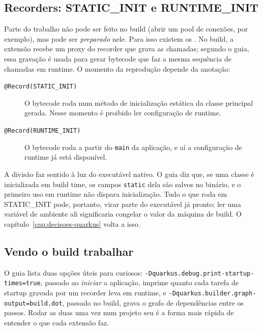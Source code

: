 \subsection*{Recorders: STATIC\_INIT e RUNTIME\_INIT}

Parte do trabalho não pode ser feito no build (abrir um pool de conexões,
por exemplo), mas pode ser \emph{preparado} nele. Para isso existem os
. No build, a extensão recebe um proxy do recorder que grava
as chamadas; segundo o guia, essa gravação é usada para gerar bytecode que
faz a mesma sequência de chamadas em runtime. O momento da reprodução
depende da anotação:

\begin{description}
\item[\texttt{@Record(STATIC\_INIT)}] O bytecode roda num método de
  inicialização estática da classe principal gerada. Nesse momento é
  proibido ler configuração de runtime.
\item[\texttt{@Record(RUNTIME\_INIT)}] O bytecode roda a partir do
  \texttt{main} da aplicação, e aí a configuração de runtime já está
  disponível.
\end{description}

A divisão faz sentido à luz do executável nativo. O guia
 diz que, se uma classe é
inicializada em build time, os campos \texttt{static} dela são salvos no
binário, e o primeiro uso em runtime não dispara inicialização. Tudo o
que roda em STATIC\_INIT pode, portanto, virar parte do executável já
pronto; ler uma variável de ambiente ali significaria congelar o valor
da máquina de build. O capítulo~\ref{cap:decisoes-quarkus} volta a isso.

\subsection*{Vendo o build trabalhar}

O guia lista duas opções úteis para curiosos:
\texttt{-Dquarkus.debug.print-startup-times=true}, passado ao
\emph{iniciar} a aplicação, imprime quanto cada tarefa de startup gravada
por um recorder leva em runtime, e
\texttt{-Dquarkus.builder.graph-output=build.dot}, passado no build, grava o
grafo de dependências entre os passos. Rodar as duas uma vez num projeto
seu é a forma mais rápida de entender o que cada extensão faz.

